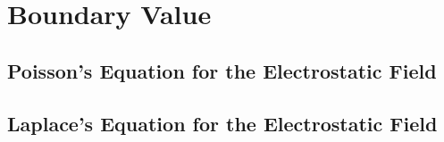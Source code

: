 \section{Boundary Value}

\subsection{Poisson's Equation for the Electrostatic Field}

\subsection{Laplace's Equation for the Electrostatic Field}

